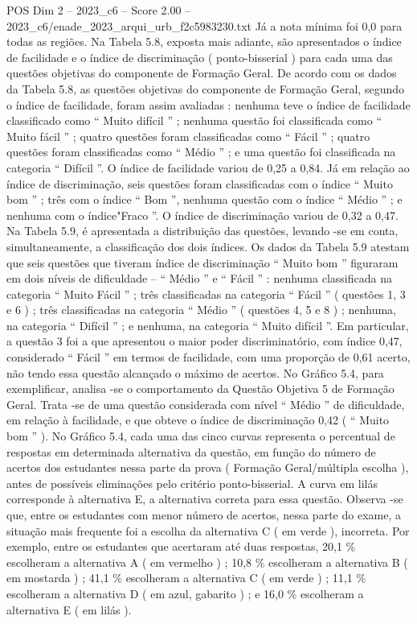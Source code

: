 \begin{textsample}{POS Dim 2 – 2023\_c6 – Score 2.00 – 2023\_c6/enade\_2023\_arqui\_urb\_f2c5983230.txt}
Já a nota mínima foi 0,0 para todas as regiões.
Na Tabela 5.8, exposta mais adiante, são apresentados o índice de facilidade e o índice de discriminação ( ponto-bisserial ) para cada uma das questões objetivas do componente de Formação Geral.
De acordo com os dados da Tabela 5.8, as questões objetivas do componente de Formação Geral, segundo o índice de facilidade, foram assim avaliadas : nenhuma teve o índice de facilidade classificado como “ Muito difícil ” ; nenhuma questão foi classificada como “ Muito fácil ” ; quatro questões foram classificadas como “ Fácil ” ; quatro questões foram classificadas como “ Médio ” ; e uma questão foi classificada na categoria “ Difícil ”.
O índice de facilidade variou de 0,25 a 0,84.
Já em relação ao índice de discriminação, seis questões foram classificadas com o índice “ Muito bom ” ; três com o índice “ Bom ”, nenhuma questão com o índice “ Médio ” ; e nenhuma com o índice"Fraco ”.
O índice de discriminação variou de 0,32 a 0,47.
Na Tabela 5.9, é apresentada a distribuição das questões, levando -se em conta, simultaneamente, a classificação dos dois índices.
Os dados da Tabela 5.9 atestam que seis questões que tiveram índice de discriminação “ Muito bom ” figuraram em dois níveis de dificuldade – “ Médio ” e “ Fácil ” : nenhuma classificada na categoria “ Muito Fácil ” ; três classificadas na categoria “ Fácil ” ( questões 1, 3 e 6 ) ; três classificadas na categoria “ Médio ” ( questões 4, 5 e 8 ) ; nenhuma, na categoria “ Difícil ” ; e nenhuma, na categoria “ Muito difícil ”.
Em particular, a questão 3 foi a que apresentou o maior poder discriminatório, com índice 0,47, considerado “ Fácil ” em termos de facilidade, com uma proporção de 0,61 acerto, não tendo essa questão alcançado o máximo de acertos.
No Gráfico 5.4, para exemplificar, analisa -se o comportamento da Questão Objetiva 5 de Formação Geral.
Trata -se de uma questão considerada com nível “ Médio ” de dificuldade, em relação à facilidade, e que obteve o índice de discriminação 0,42 ( “ Muito bom ” ).
No Gráfico 5.4, cada uma das cinco curvas representa o percentual de respostas em determinada alternativa da questão, em função do número de acertos dos estudantes nessa parte da prova ( Formação Geral/múltipla escolha ), antes de possíveis eliminações pelo critério ponto-bisserial.
A curva em lilás corresponde à alternativa E, a alternativa correta para essa questão.
Observa -se que, entre os estudantes com menor número de acertos, nessa parte do exame, a situação mais frequente foi a escolha da alternativa C ( em verde ), incorreta.
Por exemplo, entre os estudantes que acertaram até duas respostas, 20,1 \% escolheram a alternativa A ( em vermelho ) ; 10,8 \% escolheram a alternativa B ( em mostarda ) ; 41,1 \% escolheram a alternativa C ( em verde ) ; 11,1 \% escolheram a alternativa D ( em azul, gabarito ) ; e 16,0 \% escolheram a alternativa E ( em lilás ).

\end{textsample}
